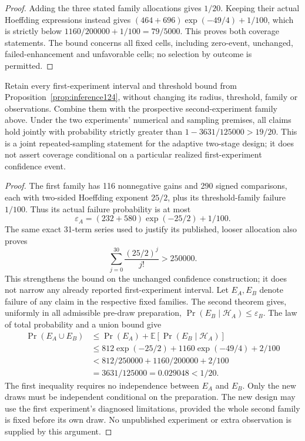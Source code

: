 \begin{proof}
Adding the three stated family allocations gives $1/20$. Keeping
their actual Hoeffding expressions instead gives
$(464+696)\exp(-49/4)+1/100$, which is strictly below
$1160/200000+1/100=79/5000$. This proves both coverage statements.
The bound concerns all fixed cells, including zero-event, unchanged,
failed-enhancement and unfavorable cells; no selection by outcome is
permitted.
\end{proof}

\begin{corollary}
\label{cor:jointinference124ab}
Retain every first-experiment interval and threshold bound from
Proposition~\ref{prop:inference124}, without changing its radius,
threshold, family or observations. Combine them with the prospective
second-experiment family above. Under the two experiments' numerical
and sampling premises, all claims hold jointly with probability
strictly greater than $1-3631/125000>19/20$.
This is a joint repeated-sampling statement for the adaptive two-stage
design; it does not assert coverage conditional on a particular
realized first-experiment confidence event.
\end{corollary}

\begin{proof}
The first family has 116 nonnegative gains and 290 signed comparisons,
each with two-sided Hoeffding exponent $25/2$, plus its threshold-family
failure $1/100$. Thus its actual failure probability is at most
\[
 \varepsilon_A=(232+580)\exp(-25/2)+1/100.
\]
The same exact 31-term series used to justify its published, looser
allocation also proves
\[
 \sum_{j=0}^{30}\frac{(25/2)^j}{j!}>250000.
\]
This strengthens the bound on the unchanged confidence construction;
it does not narrow any already reported first-experiment interval.
Let $E_A,E_B$ denote failure of any claim in the respective fixed
families. The second theorem gives, uniformly in all admissible
pre-draw preparation,
$\Pr(E_B\mid\mathcal H_A)\le\varepsilon_B$.
The law of total probability and a union bound give
\begin{align*}
 \Pr(E_A\cup E_B)
 &\le\Pr(E_A)+\mathbb E[\Pr(E_B\mid\mathcal H_A)]\\
 &\le812\exp(-25/2)+1160\exp(-49/4)+2/100\\
 &<812/250000+1160/200000+2/100\\
 &=3631/125000=0.029048<1/20.
\end{align*}
The first inequality requires no independence between $E_A$ and $E_B$.
Only the new draws must be independent conditional on the preparation.
The new design may use the first experiment's diagnosed limitations,
provided the whole second family is fixed before its own draw.
No unpublished experiment or extra observation is supplied by this
argument.
\end{proof}

